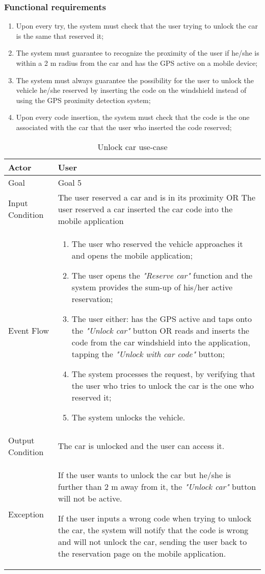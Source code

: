 \subsubsection{Functional requirements}
\begin{enumerate}
\item Upon every try, the system must check that the user trying to unlock the car is the same that reserved it;
\item The system must guarantee to recognize the proximity of the user if he/she is within a 2 m radius from the car and has the GPS active on a mobile device;
\item The system must always guarantee the possibility for the user to unlock the vehicle he/she reserved by inserting the code on the windshield instead of using the GPS proximity detection system;
\item Upon every code insertion, the system must check that the code is the one associated with the car that the user who inserted the code reserved;
\end{enumerate}

\begin{table}[H]
\begin{center}
\begin{tabular}{p{} | p{}}
\hline
Actor & User\\
\hline
Goal & Goal 5\\
\hline
Input Condition & The user reserved a car and is in its proximity OR The user reserved a car inserted the car code into the mobile application\\
\hline
Event Flow & 
\begin{enumerate}
\item The user who reserved the vehicle approaches it and opens the mobile application;
\item The user opens the \emph{"Reserve car"} function and the system provides the sum-up of his/her active reservation;
\item The user either: has the GPS active and taps onto the \emph{"Unlock car"} button OR reads and inserts the code from the car windshield into the application, tapping the \emph{"Unlock with car code"} button;
\item The system processes the request, by verifying that the user who tries to unlock the car is the one who reserved it;
\item The system unlocks the vehicle.
\end{enumerate} \\
\hline
Output Condition & The car is unlocked and the user can access it.\\
\hline
Exception & If the user wants to unlock the car but he/she is further than 2 m away from it, the \emph{"Unlock car"} button will not be active.

If the user inputs a wrong code when trying to unlock the car, the system will notify that the code is wrong and will not unlock the car, sending the user back to the reservation page on the mobile application.\\
\hline
\end{tabular}
\end{center}
\caption{Unlock car use-case}
\label{unlock_car_uc}
\end{table}
